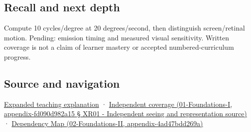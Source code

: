 \subsection{Recall and next depth}\label{recall-and-next-depth}

Compute 10 cycles/degree at 20 degrees/second, then distinguish screen/retinal motion. Pending: emission timing and measured visual sensitivity. Written coverage is not a claim of learner mastery or accepted numbered-curriculum progress.

\subsection{Source and navigation}\label{source-and-navigation}

\href{Continuous\%20Notes/University\%20-\%20Worlds,\%20Images\%20and\%20Inference\%20-\%20Graphics,\%20Vision\%20and\%20Photography\#A\%20gaze\%20sample\%20needs\%20a\%20time\%20as\%20well\%20as\%20a\%20direction}{Expanded teaching explanation} · \href{}{Independent coverage (01-Foundations-I, appendix-fd090d982a15 § XR01 - Independent seeing and representation source)} · \href{}{Dependency Map (02-Foundations-II, appendix-4ad47bdd269a)}
